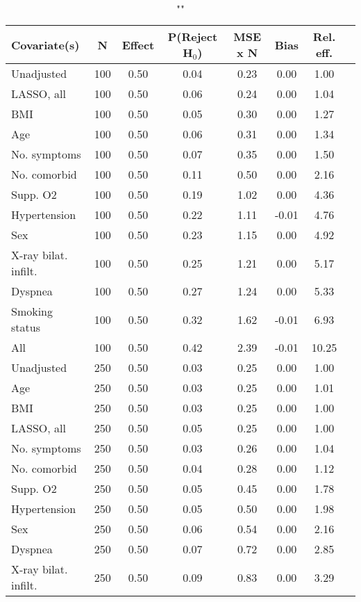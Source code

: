 \documentclass{article}
\begin{document}
{\tabcolsep=6pt  %
\begin{longtable}{lccccccc}
\caption{""} \\
Covariate(s) & N & Effect & P(Reject H$_0$) & MSE x N & Bias & Rel. eff.\\ \midrule
Unadjusted & 100 & 0.50 & 0.04 & 0.23 &  0.00 &  1.00 \\ 
LASSO, all & 100 & 0.50 & 0.06 & 0.24 &  0.00 &  1.04 \\ 
BMI & 100 & 0.50 & 0.05 & 0.30 &  0.00 &  1.27 \\ 
Age & 100 & 0.50 & 0.06 & 0.31 &  0.00 &  1.34 \\ 
No. symptoms & 100 & 0.50 & 0.07 & 0.35 &  0.00 &  1.50 \\ 
No. comorbid & 100 & 0.50 & 0.11 & 0.50 &  0.00 &  2.16 \\ 
Supp. O2 & 100 & 0.50 & 0.19 & 1.02 &  0.00 &  4.36 \\ 
Hypertension & 100 & 0.50 & 0.22 & 1.11 & -0.01 &  4.76 \\ 
Sex & 100 & 0.50 & 0.23 & 1.15 &  0.00 &  4.92 \\ 
X-ray bilat. infilt. & 100 & 0.50 & 0.25 & 1.21 &  0.00 &  5.17 \\ 
Dyspnea & 100 & 0.50 & 0.27 & 1.24 &  0.00 &  5.33 \\ 
Smoking status & 100 & 0.50 & 0.32 & 1.62 & -0.01 &  6.93 \\ 
All & 100 & 0.50 & 0.42 & 2.39 & -0.01 & 10.25 \\ \midrule 
Unadjusted & 250 & 0.50 & 0.03 & 0.25 &  0.00 &  1.00 \\ 
Age & 250 & 0.50 & 0.03 & 0.25 &  0.00 &  1.01 \\ 
BMI & 250 & 0.50 & 0.03 & 0.25 &  0.00 &  1.00 \\ 
LASSO, all & 250 & 0.50 & 0.05 & 0.25 &  0.00 &  1.00 \\ 
No. symptoms & 250 & 0.50 & 0.03 & 0.26 &  0.00 &  1.04 \\ 
No. comorbid & 250 & 0.50 & 0.04 & 0.28 &  0.00 &  1.12 \\ 
Supp. O2 & 250 & 0.50 & 0.05 & 0.45 &  0.00 &  1.78 \\ 
Hypertension & 250 & 0.50 & 0.05 & 0.50 &  0.00 &  1.98 \\ 
Sex & 250 & 0.50 & 0.06 & 0.54 &  0.00 &  2.16 \\ 
Dyspnea & 250 & 0.50 & 0.07 & 0.72 &  0.00 &  2.85 \\ 
X-ray bilat. infilt. & 250 & 0.50 & 0.09 & 0.83 &  0.00 &  3.29 \\ 

\end{longtable}}
\end{document}
